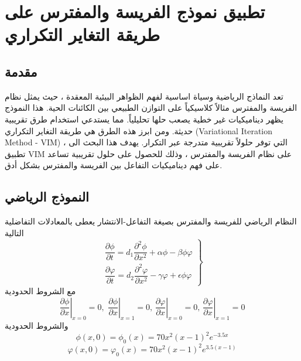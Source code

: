 \chapter{تطبيق نموذج الفريسة والمفترس على طريقة التغاير التكراري}

\section*{مقدمة}

تعد النماذج الرياضية وسياة اساسية لفهم الظواهر البيئية المعقدة ، حيث يمثل نظام الفريسة والمفترس مثالاً كلاسيكياً على التوازن الطبيعي بين الكائنات الحية. هذا النموذج يظهر ديناميكيات غير خطية يصعب حلها تحليلياً. مما يستدعي استخدام طرق تقريبية حديثة. ومن ابرز هذه الطرق هي طريقة التغاير التكراري \linebreak
(Variational Iteration Method - VIM)
، التي توفر حلولاً تقريبية متدرجة عبر التكرار. يهدف هذا البحث الى تطبيق VIM على نظام الفريسة والمفترس ، وذلك للحصول على حلول تقريبية تساعد على فهم ديناميكيات التفاعل بين الفريسة والمفترس بشكل أدق.

\section{النموذج الرياضي}
النظام الرياضي للفريسة والمفترس بصيغة التفاعل-الانتشار يعطى بالمعادلات التفاضلية التالية
\[
\left.\begin{array}{c}
	\dfrac{\partial \phi}{\partial t} = d_1  \dfrac{\partial^2\phi}{\partial x^2} + \alpha\phi - \beta\phi\varphi\\[20pt]
	\dfrac{\partial \varphi}{\partial t} = d_2  \dfrac{\partial^2\varphi}{\partial x^2} -  \gamma\varphi + \epsilon\phi\varphi
\end{array}\right\}
\]
مع الشروط الحدودية
\[
\left.\frac{\partial \phi}{\partial x}\right|_{x=0} = 0,\,\,
\left.\frac{\partial \phi}{\partial x}\right|_{x=1} = 0,\,
\left.\frac{\partial \varphi}{\partial x}\right|_{x=0} = 0,\,
\left.\frac{\partial \varphi}{\partial x}\right|_{x=1} = 0
\]
والشروط الحدودية
\[
\phi(x, 0) = \phi_0(x) = 70x^2(x-1)^2 e^{-3.5 x}
\]
\[
\varphi(x, 0) = \varphi_0(x) = 70x^2(x-1)^2 e^{3.5 (x-1)}
\]

